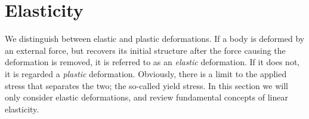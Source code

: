 \documentclass[twoside,english]{uiofysmaster}
\begin{document}
%		















\section{Elasticity}


We distinguish between elastic and plastic deformations.
If a body is deformed by an external force, but recovers its initial structure after the force causing the deformation is removed, it is referred to as an \textit{elastic} deformation. 
If it does not, it is regarded a \textit{plastic} deformation. 
Obviously, there is a limit to the applied stress that separates the two;  the so-called yield stress. 
In this section we will only consider elastic deformations, and review fundamental concepts of linear elasticity. 
\end{document}
